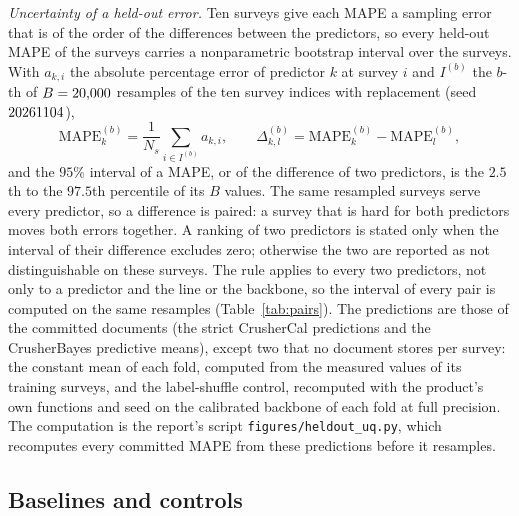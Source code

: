 \emph{Uncertainty of a held-out error.} Ten surveys give each MAPE a sampling error that is of the order of the differences between the
predictors, so every held-out MAPE of the surveys carries a nonparametric bootstrap interval over the surveys. With $a_{k,i}$ the absolute
percentage error of predictor $k$ at survey $i$ and $I^{(b)}$ the $b$-th of $B=20{,}000$ resamples of the ten survey indices with replacement
(seed $20261104$),
\begin{equation}
\mathrm{MAPE}^{(b)}_k = \frac{1}{N_s}\sum_{i\in I^{(b)}} a_{k,i},\qquad
\Delta^{(b)}_{k,l} = \mathrm{MAPE}^{(b)}_k - \mathrm{MAPE}^{(b)}_l ,
\label{eq:bootstrap}
\end{equation}
and the $95\%$ interval of a MAPE, or of the difference of two predictors, is the $2.5$th to the $97.5$th percentile of its $B$ values. The
same resampled surveys serve every predictor, so a difference is paired: a survey that is hard for both predictors moves both errors
together. A ranking of two predictors is stated only when the interval of their difference excludes zero; otherwise the two are reported as
not distinguishable on these surveys. The rule applies to every two predictors, not only to a predictor and the line or the backbone, so the
interval of every pair is computed on the same resamples (Table~\ref{tab:pairs}). The predictions are those of the committed documents (the strict CrusherCal predictions and the
CrusherBayes predictive means), except two that no document stores per survey: the constant mean of each fold, computed from the
measured values of its training surveys, and the label-shuffle control, recomputed with the product's own functions and seed on the
calibrated backbone of each fold at full precision. The computation is the report's script
\texttt{figures/\allowbreak{}heldout\_uq.py}, which recomputes every committed MAPE from these predictions before it resamples.

\subsection{Baselines and controls}\label{sec:protocol-baselines}

